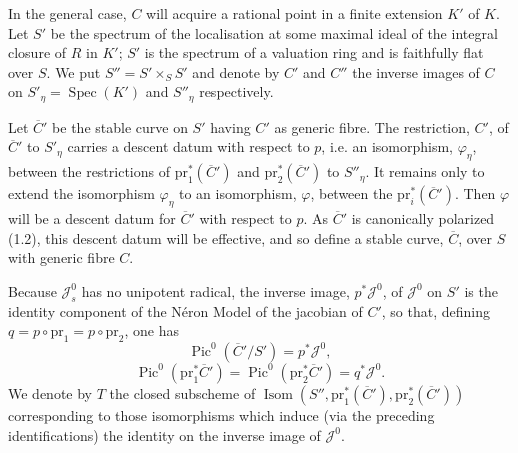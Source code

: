 \documentclass[10pt]{article}
\newcommand{\Spec}{\operatorname{Spec}}
\newcommand{\Isom}{\operatorname{Isom}}
\newcommand{\Pic}{\operatorname{Pic}}
\begin{document}
In the general case, $C$ will acquire a rational point in a finite extension $K'$ of $K$. Let $S'$ be the spectrum of the localisation at some maximal ideal of the integral closure of $R$ in $K'$; $S'$ is the spectrum of a valuation ring and is faithfully flat over $S$. We put $S''=S'\times_S S'$ and denote by $C'$ and $C''$ the inverse images of $C$ on $S'_\eta=\Spec(K')$ and $S''_\eta$ respectively.
\begin{center}
\end{center}

Let $\overline C'$ be the stable curve on $S'$ having $C'$ as generic fibre. The restriction, $C'$, of $\overline C'$ to $S'_\eta$ carries a descent datum with respect to $p$, i.e. an isomorphism, $\varphi_\eta$, between the restrictions of $\mathrm{pr}_1^*(\overline C')$ and $\mathrm{pr}_2^*(\overline C')$ to $S''_\eta$. It remains only to extend the isomorphism $\varphi_\eta$ to an isomorphism, $\varphi$, between the $\mathrm{pr}_i^*(\overline C')$. Then $\varphi$ will be a descent datum for $\overline C'$ with respect to $p$. As $\overline C'$ is canonically polarized (1.2), this descent datum will be effective, and so define a stable curve, $\overline C$, over $S$ with generic fibre $C$.

Because $\mathscr J_s^0$ has no unipotent radical, the inverse image, $p^*\mathscr J^0$, of $\mathscr J^0$ on $S'$ is the identity component of the Néron Model of the jacobian of $C'$, so that, defining $q=p\circ\mathrm{pr}_1=p\circ\mathrm{pr}_2$, one has
\[
\Pic^0(\overline C'/S')=p^*\mathscr J^0,
\]
\[
\Pic^0(\mathrm{pr}_1^*\overline C')=\Pic^0(\mathrm{pr}_2^*\overline C')=q^*\mathscr J^0.
\]
We denote by $T$ the closed subscheme of $\Isom(S'',\mathrm{pr}_1^*(\overline C'),\mathrm{pr}_2^*(\overline C'))$ corresponding to those isomorphisms which induce (via the preceding identifications) the identity on the inverse image of $\mathscr J^0$.
\end{document}
